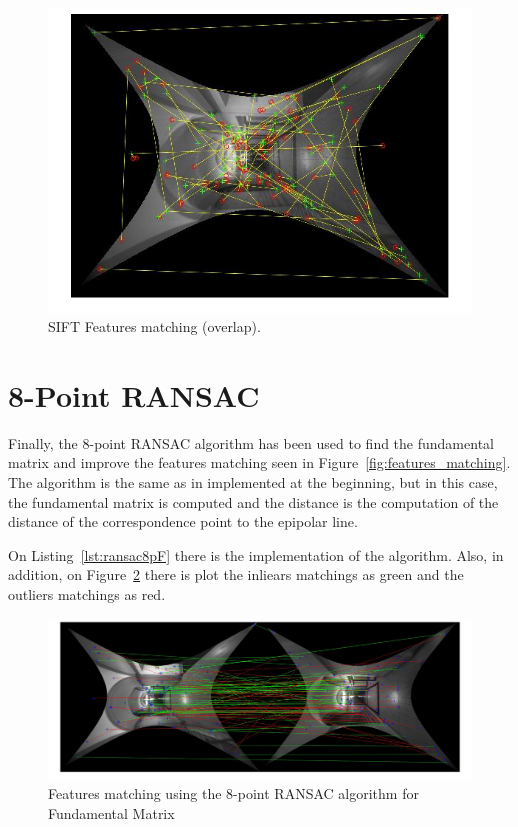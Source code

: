 \documentclass{ethz_report}
\begin{document}
\begin{figure}[H]
\centering
\includegraphics[width=.8\linewidth]{images/sift_matching_2}
\caption{SIFT Features matching (overlap).}
\label{fig:features_matching_overlap}
\end{figure}

\section*{8-Point RANSAC}

Finally, the 8-point RANSAC algorithm has been used to find the fundamental matrix and improve the
features matching seen in Figure~\ref{fig:features_matching}. The algorithm is the same as in
implemented at the beginning, but in this case, the fundamental matrix is computed and the distance
is the computation of the distance of the correspondence point to the epipolar line.

On Listing~\ref{lst:ransac8pF} there is the implementation of the algorithm. Also, in addition, on
Figure~\ref{fig:features_matching_ransac} there is plot the inliears matchings as green and the
outliers matchings as red.



\begin{figure}[H]
\centering
\includegraphics[width=1\linewidth]{images/ransac8p_features}
\caption{Features matching using the 8-point RANSAC algorithm for Fundamental Matrix}
\label{fig:features_matching_ransac}
\end{figure}
\end{document}
